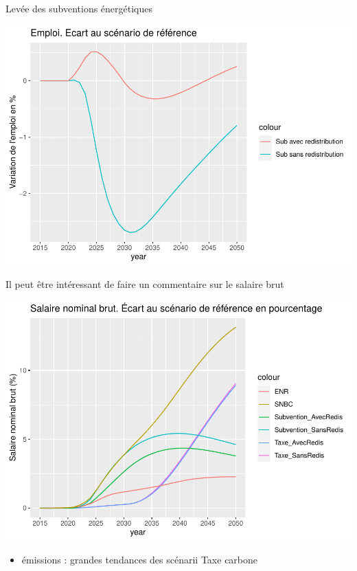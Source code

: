 \documentclass[
]{article}
\providecommand{\tightlist}{%
  \setlength{\itemsep}{0pt}\setlength{\parskip}{0pt}}
\begin{document}
Levée des subventions énergétiques

\includegraphics{Modele-ThreeMe-Tunisie_Sequeira_Valilou_Wang_files/figure-latex/unnamed-chunk-11-1.pdf}

Il peut être intéressant de faire un commentaire sur le salaire brut

\includegraphics{Modele-ThreeMe-Tunisie_Sequeira_Valilou_Wang_files/figure-latex/unnamed-chunk-12-1.pdf}

\begin{itemize}
\tightlist
\item
  émissions : grandes tendances des scénarii Taxe carbone
\end{itemize}
\end{document}
